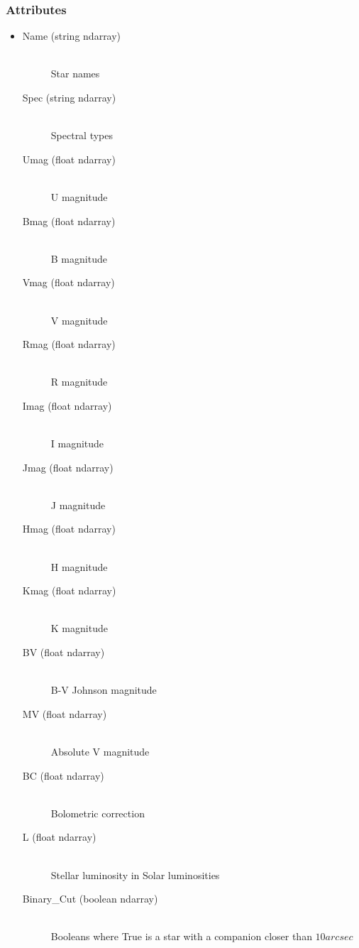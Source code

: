 \documentclass[cleanfoot]{asme2ej}
\begin{document}
\subsubsection*{Attributes}
\begin{itemize}
    \item 
    \begin{description}
        \item[Name (string ndarray)] \hfill \\
        Star names
        \item[Spec (string ndarray)] \hfill \\
        Spectral types
        \item[Umag (float ndarray)] \hfill \\
        U magnitude
        \item[Bmag (float ndarray)] \hfill \\
        B magnitude
        \item[Vmag (float ndarray)] \hfill \\
        V magnitude
        \item[Rmag (float ndarray)] \hfill \\
        R magnitude
        \item[Imag (float ndarray)] \hfill \\
        I magnitude
        \item[Jmag (float ndarray)] \hfill \\
        J magnitude
        \item[Hmag (float ndarray)] \hfill \\
        H magnitude
        \item[Kmag (float ndarray)] \hfill \\
        K magnitude
        \item[BV (float ndarray)] \hfill \\
        B-V Johnson magnitude
        \item[MV (float ndarray)] \hfill \\
        Absolute V magnitude
        \item[BC (float ndarray)] \hfill \\
        Bolometric correction
        \item[L (float ndarray)] \hfill \\
        Stellar luminosity in Solar luminosities
        \item[Binary\_Cut (boolean ndarray)] \hfill \\ Booleans where True is a star with a companion closer than $ 10 arcsec $





\end{description}
\end{itemize}
\end{document}
